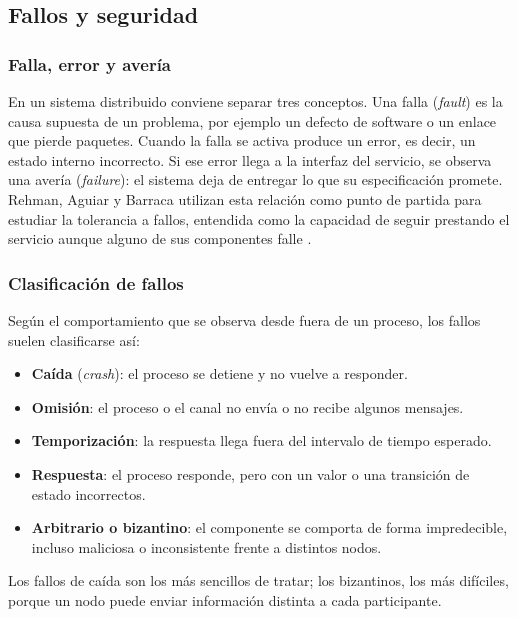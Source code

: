 \subsection{Fallos y seguridad}
\label{sec:fundamento-herrera}

\subsubsection{Falla, error y avería}

En un sistema distribuido conviene separar tres conceptos. Una falla (\emph{fault})
es la causa supuesta de un problema, por ejemplo un defecto de software o un enlace
que pierde paquetes. Cuando la falla se activa produce un error, es decir, un estado
interno incorrecto. Si ese error llega a la interfaz del servicio, se observa una
avería (\emph{failure}): el sistema deja de entregar lo que su especificación promete.
Rehman, Aguiar y Barraca utilizan esta relación como punto de partida para estudiar
la tolerancia a fallos, entendida como la capacidad de seguir prestando el servicio
aunque alguno de sus componentes falle \cite{herrera_rehman2022}.

\subsubsection{Clasificación de fallos}

Según el comportamiento que se observa desde fuera de un proceso, los fallos
suelen clasificarse así:

\begin{itemize}
  \item \textbf{Caída} (\emph{crash}): el proceso se detiene y no vuelve a responder.
  \item \textbf{Omisión}: el proceso o el canal no envía o no recibe algunos mensajes.
  \item \textbf{Temporización}: la respuesta llega fuera del intervalo de tiempo esperado.
  \item \textbf{Respuesta}: el proceso responde, pero con un valor o una transición
        de estado incorrectos.
  \item \textbf{Arbitrario o bizantino}: el componente se comporta de forma
        impredecible, incluso maliciosa o inconsistente frente a distintos nodos.
\end{itemize}

Los fallos de caída son los más sencillos de tratar; los bizantinos, los más difíciles,
porque un nodo puede enviar información distinta a cada participante.


